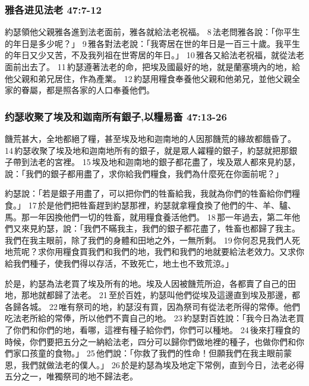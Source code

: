 \subsubsection{雅各进见法老 47:7-12}
約瑟領他父親雅各進到法老面前，雅各就給法老祝福。 8 法老問雅各說：「你平生的年日是多少呢？」 9 雅各對法老說：「我寄居在世的年日是一百三十歲。我平生的年日又少又苦，不及我列祖在世寄居的年日。」 10 雅各又給法老祝福，就從法老面前出去了。 11 約瑟遵著法老的命，把埃及國最好的地，就是蘭塞境內的地，給他父親和弟兄居住，作為產業。 12 約瑟用糧食奉養他父親和他弟兄，並他父親全家的眷屬，都是照各家的人口奉養他們。

\subsubsection{约瑟收聚了埃及和迦南所有銀子,以糧易畜 47:13-26}%
饑荒甚大，全地都絕了糧，甚至埃及地和迦南地的人因那饑荒的緣故都餓昏了。 14 約瑟收聚了埃及地和迦南地所有的銀子，就是眾人糴糧的銀子，約瑟就把那銀子帶到法老的宮裡。 15 埃及地和迦南地的銀子都花盡了，埃及眾人都來見約瑟，說：「我們的銀子都用盡了，求你給我們糧食，我們為什麼死在你面前呢？」

約瑟說：「若是銀子用盡了，可以把你們的牲畜給我，我就為你們的牲畜給你們糧食。」 17 於是他們把牲畜趕到約瑟那裡，約瑟就拿糧食換了他們的牛、羊、驢、馬。那一年因換他們一切的牲畜，就用糧食養活他們。 18 那一年過去，第二年他們又來見約瑟，說：「我們不瞞我主，我們的銀子都花盡了，牲畜也都歸了我主。我們在我主眼前，除了我們的身體和田地之外，一無所剩。 19 你何忍見我們人死地荒呢？求你用糧食買我們和我們的地，我們和我們的地就要給法老效力。又求你給我們種子，使我們得以存活，不致死亡，地土也不致荒涼。」


於是，約瑟為法老買了埃及所有的地。埃及人因被饑荒所迫，各都賣了自己的田地，那地就都歸了法老。 21 至於百姓，約瑟叫他們從埃及這邊直到埃及那邊，都各歸各城。 22 唯有祭司的地，約瑟沒有買，因為祭司有從法老所得的常俸。他們吃法老所給的常俸，所以他們不賣自己的地。 23 約瑟對百姓說：「我今日為法老買了你們和你們的地，看哪，這裡有種子給你們，你們可以種地。 24 後來打糧食的時候，你們要把五分之一納給法老，四分可以歸你們做地裡的種子，也做你們和你們家口孩童的食物。」 25 他們說：「你救了我們的性命！但願我們在我主眼前蒙恩，我們就做法老的僕人。」 26 於是約瑟為埃及地定下常例，直到今日，法老必得五分之一，唯獨祭司的地不歸法老。


